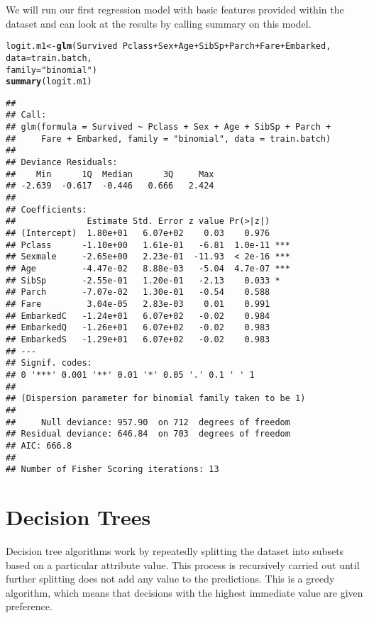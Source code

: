 \documentclass[a4paper,10pt]{report}\usepackage[]{graphicx}\usepackage[]{color}
\makeatletter
\newcommand{\hlstr}[1]{\textcolor[rgb]{0.192,0.494,0.8}{#1}}%
\newcommand{\hlopt}[1]{\textcolor[rgb]{0,0,0}{#1}}%
\newcommand{\hlstd}[1]{\textcolor[rgb]{0.345,0.345,0.345}{#1}}%
\newcommand{\hlkwb}[1]{\textcolor[rgb]{0.69,0.353,0.396}{#1}}%
\newcommand{\hlkwc}[1]{\textcolor[rgb]{0.333,0.667,0.333}{#1}}%
\newcommand{\hlkwd}[1]{\textcolor[rgb]{0.737,0.353,0.396}{\textbf{#1}}}%
\newenvironment{kframe}{%
 \def\at@end@of@kframe{}%
 \ifinner\ifhmode%
  \def\at@end@of@kframe{\end{minipage}}%
  \begin{minipage}{\columnwidth}%
 \fi\fi%
 \def\FrameCommand##1{\hskip\@totalleftmargin \hskip-\fboxsep
 \colorbox{shadecolor}{##1}\hskip-\fboxsep
     \hskip-\linewidth \hskip-\@totalleftmargin \hskip\columnwidth}%
 \MakeFramed {\advance\hsize-\width
   \@totalleftmargin\z@ \linewidth\hsize
   \@setminipage}}%
 {\par\unskip\endMakeFramed%
 \at@end@of@kframe}
\newenvironment{knitrout}{}{} %
\makeatother
\begin{document}
We will run our first regression model with basic features provided within the dataset and can look at the results by calling summary on this model.
\begin{knitrout}
\color{fgcolor}\begin{kframe}
\begin{alltt}
\hlstd{logit.m1} \hlkwb{<-} \hlkwd{glm}\hlstd{(Survived} \hlopt{~} \hlstd{Pclass} \hlopt{+} \hlstd{Sex} \hlopt{+} \hlstd{Age} \hlopt{+} \hlstd{SibSp} \hlopt{+} \hlstd{Parch} \hlopt{+} \hlstd{Fare} \hlopt{+} \hlstd{Embarked,}
                \hlkwc{data} \hlstd{= train.batch,}
                \hlkwc{family}\hlstd{=}\hlstr{"binomial"}\hlstd{)}
\hlkwd{summary}\hlstd{(logit.m1)}
\end{alltt}
\begin{verbatim}
## 
## Call:
## glm(formula = Survived ~ Pclass + Sex + Age + SibSp + Parch + 
##     Fare + Embarked, family = "binomial", data = train.batch)
## 
## Deviance Residuals: 
##    Min      1Q  Median      3Q     Max  
## -2.639  -0.617  -0.446   0.666   2.424  
## 
## Coefficients:
##              Estimate Std. Error z value Pr(>|z|)    
## (Intercept)  1.80e+01   6.07e+02    0.03    0.976    
## Pclass      -1.10e+00   1.61e-01   -6.81  1.0e-11 ***
## Sexmale     -2.65e+00   2.23e-01  -11.93  < 2e-16 ***
## Age         -4.47e-02   8.88e-03   -5.04  4.7e-07 ***
## SibSp       -2.55e-01   1.20e-01   -2.13    0.033 *  
## Parch       -7.07e-02   1.30e-01   -0.54    0.588    
## Fare         3.04e-05   2.83e-03    0.01    0.991    
## EmbarkedC   -1.24e+01   6.07e+02   -0.02    0.984    
## EmbarkedQ   -1.26e+01   6.07e+02   -0.02    0.983    
## EmbarkedS   -1.29e+01   6.07e+02   -0.02    0.983    
## ---
## Signif. codes:  
## 0 '***' 0.001 '**' 0.01 '*' 0.05 '.' 0.1 ' ' 1
## 
## (Dispersion parameter for binomial family taken to be 1)
## 
##     Null deviance: 957.90  on 712  degrees of freedom
## Residual deviance: 646.84  on 703  degrees of freedom
## AIC: 666.8
## 
## Number of Fisher Scoring iterations: 13
\end{verbatim}
\end{kframe}
\end{knitrout}


\section{Decision Trees}
Decision tree algorithms work by repeatedly splitting the dataset into subsets based on a particular attribute value. This process is recursively carried out until further splitting does not add any value to the predictions. This is a greedy algorithm, which means that decisions with the highest immediate value are given preference.
\end{document}
